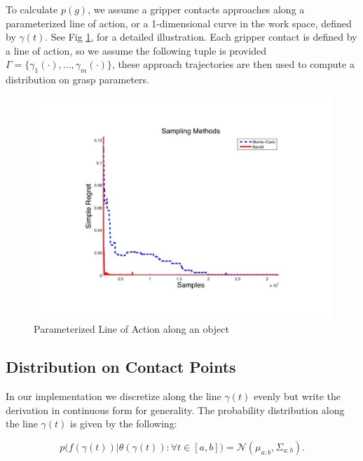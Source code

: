 \documentclass[letterpaper, 10 pt, conference]{ieeeconf}  %
\newcommand{\mN}{\mathcal{N}}
\begin{document}
 To calculate $p(g)$, we assume a gripper contacts approaches along a parameterized line of action, or a 1-dimensional curve in the work space, defined by $\gamma(t)$. See Fig \ref{fig:line_of_action}, for a detailed illustration. Each gripper contact is defined by a line of action, so we assume the following tuple is provided $\Gamma = \lbrace \gamma_1(\cdot),...,\gamma_m(\cdot) \rbrace$, these approach trajectories are then used to compute a distribution on grasp parameters. 
 





\begin{figure}[ht!]
\centering
\includegraphics[scale = 0.3]{figures/Slide01.jpg}
\caption{Parameterized Line of Action along an object}
\vspace*{-10pt}
\label{fig:line_of_action}
\end{figure}
\subsection{Distribution on Contact Points} 
In our implementation we discretize along the line $\gamma(t)$ evenly but write the derivation in continuous form for generality.
The probability distribution along the line $\gamma(t)$ is given by the following:

\begin{equation}
p\big(f(\gamma(t))|\theta(\gamma(t)): \forall t \in [a,b] \big) 
=
\mN(\mu_{a:b},\Sigma_{a:b}).
\end{equation}
\end{document}
